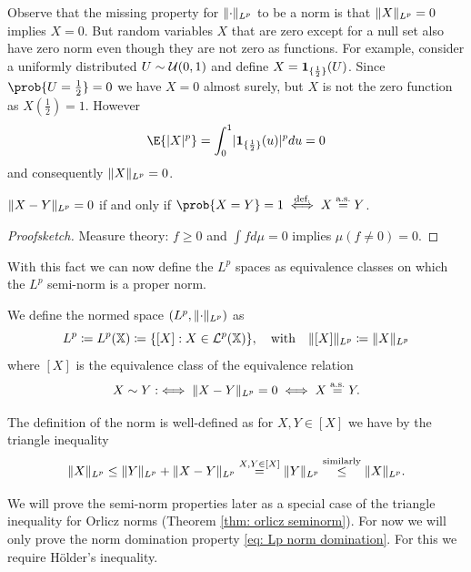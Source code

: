 \begin{example}
    Observe that the missing property for \(\lVert\cdot\rVert_{L^p}\) to be a norm 
    is that \(\lVert X\rVert_{L^p} = 0\) implies \(X=0\). But random variables \(X\)
    that are zero except for a null set also have zero norm even though they
    are not zero as functions. For example, consider a uniformly distributed
    \(U\sim \mathcal{U}(0,1)\) and
    define \(X= \ind*{\frac12}(U)\). Since \(\prob{U=\frac12} = 0\) we have \(X=0\)
    almost surely, but \(X\) is not the zero function as \(X(\frac12) = 1\).
    However
    \[
        \E{\abs{X}^p}
        = \int_0^1 \abs{\ind*{\frac12}(u)}^p du
        = 0
    \]
    and consequently \(\lVert X\rVert_{L^p} = 0\).
\end{example}

\begin{fact}
    \label{fact: Lp zero norm}
    \(\lVert X-Y\rVert_{L^p} = 0\) if and only if \(\prob{X=Y}=1 \overset{\text{def.}}\iff X\overset{\as}= Y\).
\end{fact}
\begin{proof}[Proofsketch]
    Measure theory: \(f\ge 0\) and \(\int f d\mu = 0\) 
    implies \(\mu(f\neq 0) = 0\).
\end{proof}

With this fact we can now define the \(L^p\) spaces as equivalence classes on which
the \(L^p\) semi-norm is a proper norm.


\begin{definition}[\(L^p\) space]
    We define the normed space \((L^p,\lVert\cdot\rVert_{L^p})\) as
    \[
        L^p \coloneq L^p(\mathbb{X}) \coloneq \{[X]: X \in \mathcal{L}^p(\mathbb{X})\},
        \quad\text{with}\quad
        \lVert[X]\rVert_{L^p} \coloneq \lVert X\rVert_{L^p}
    \]
    where \([X]\) is the equivalence class of the equivalence relation
    \[
        X\sim Y :\iff \lVert X-Y\rVert_{L^p} = 0 \iff X\overset{\operatorname{\text{a.s.}}}= Y.
    \]
\end{definition}
\begin{remark}
    The definition of the norm is well-defined as for \(X,Y\in [X]\)
    we have by the triangle inequality
    \[
        \lVert X\rVert_{L^p} \le \lVert Y\rVert_{L^p} + \lVert X - Y\rVert_{L^p} \overset{X,Y\in [X]}= \lVert Y\rVert_{L^p}
        \overset{\text{similarly}}\le \lVert X\rVert_{L^p}.
    \]
\end{remark}

We will prove the semi-norm properties later as a special case of the triangle
inequality for Orlicz norms (Theorem \ref{thm: orlicz seminorm}). For now we
will only prove the norm domination property \eqref{eq: Lp norm domination}.
For this we require Hölder's inequality.

